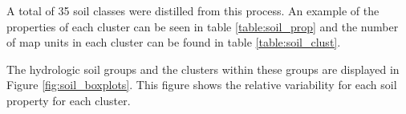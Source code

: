 A total of 35 soil classes were distilled from this process. An example of the properties of each cluster can be seen in table \ref{table:soil_prop} and the number of map units in each cluster can be found in table \ref{table:soil_clust}. 

The hydrologic soil groups and the clusters within these groups are displayed in Figure \ref{fig:soil_boxplots}. This figure shows the relative variability for each soil property for each cluster.

